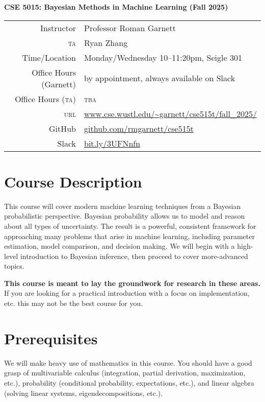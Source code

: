 \documentclass{article}
\newcommand{\acro}[1]{\textsc{\MakeLowercase{#1}}}
\begin{document}
{\large \textbf{CSE 5015: Bayesian Methods in Machine Learning (Fall 2025)}} \\[1ex]

\begin{tabular}{rl}
               Instructor & Professor Roman Garnett                                 \\
                \acro{TA} & Ryan Zhang                                              \\
            Time/Location & Monday/Wednesday 10--11:20pm, Seigle 301                \\
   Office Hours (Garnett) & by appointment, always available on Slack               \\
 Office Hours (\acro{TA}) & \acro{TBA}                                              \\
               \acro{URL} & \url{www.cse.wustl.edu/~garnett/cse515t/fall_2025/}            \\
                   GitHub & \url{github.com/rmgarnett/cse515t}    \\
     Slack & \url{bit.ly/3UFNnfn}
\end{tabular}

\section*{Course Description}

This course will cover modern machine learning techniques from a Bayesian
probabilistic perspective. Bayesian probability allows us to model and reason
about all types of uncertainty. The result is a powerful, consistent framework
for approaching many problems that arise in machine learning, including
parameter estimation, model comparison, and decision making. We will begin with
a high-level introduction to Bayesian inference, then proceed to cover
more-advanced topics.

\textbf{This course is meant to lay the groundwork for research in these
areas.} If you are looking for a practical introduction with a focus on
implementation, etc. this may not be the best course for you.

\section*{Prerequisites}

We will make heavy use of mathematics in this course.  You should have a good
grasp of multivariable calculus (integration, partial derivation, maximization,
etc.), probability (conditional probability, expectations, etc.), and linear
algebra (solving linear systems, eigendecompositions, etc.).
\end{document}
